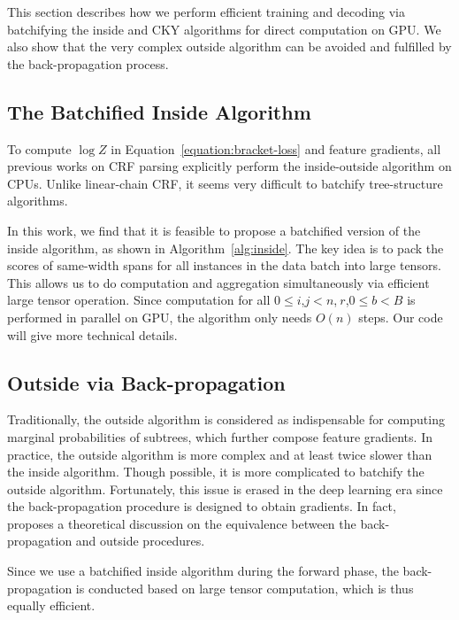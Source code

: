 \documentclass{article}
\begin{document}
This section describes how we perform efficient training and decoding via batchifying the inside and CKY algorithms for direct computation on GPU. We also show that the very complex outside algorithm can be avoided and fulfilled by the back-propagation process.



\subsection{The Batchified Inside Algorithm}

To compute $\log Z$ in Equation~\ref{equation:bracket-loss} and feature gradients, all previous works on CRF parsing \cite{finkel-etal-2008-efficient,durrett-klein-2015-neural} explicitly perform the inside-outside algorithm on CPUs.
Unlike linear-chain CRF, it seems very difficult to batchify tree-structure algorithms.



In this work, we find that it is feasible to propose a batchified version of the inside algorithm, as shown in Algorithm~\ref{alg:inside}.
The key idea is to pack the scores of same-width spans for all instances in the data batch into large tensors.
This allows us to do computation and aggregation simultaneously via efficient large tensor operation.
Since computation for all $0 \le i$,$j<n$,$~r$,$0\le b<B$ is performed in parallel on GPU, the algorithm only needs $O(n)$ steps. Our code will give more technical details.



\subsection{Outside via Back-propagation}

Traditionally, the outside algorithm is considered as indispensable for computing marginal probabilities of subtrees, which further compose feature gradients.
In practice, the outside algorithm is more complex and at least twice slower than the inside algorithm.
Though possible, it is more complicated to batchify the outside algorithm.
Fortunately, this issue is erased in the deep learning era since the back-propagation procedure is designed to obtain gradients. In fact, \citeauthor{eisner-2016-inside}~ proposes a theoretical discussion on the equivalence between the back-propagation and outside procedures.

Since we use a batchified inside algorithm during the forward phase, the back-propagation is conducted based on large tensor computation, which is thus equally efficient.
\end{document}
